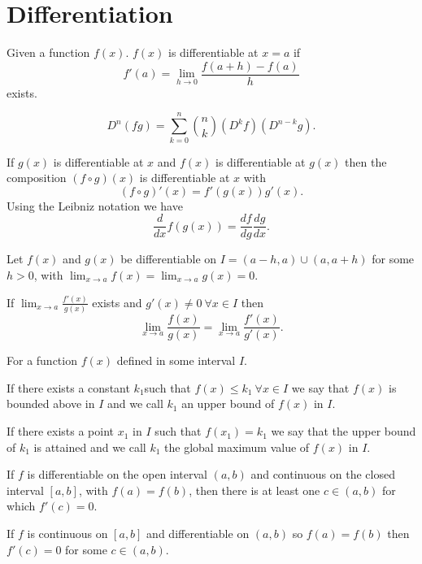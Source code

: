 \documentclass[10pt, a4paper]{article}
\begin{document}
\newpage

\section{Differentiation}

\begin{definition}
    Given a function $f(x)$.
    $f(x)$ is differentiable at $x = a$ if
    \[
    f'(a) = \lim_{h \rightarrow 0}\frac{f(a + h) - f(a)}{h}
    \]
    exists.
\end{definition}

\begin{proposition}
    \[
    D ^ n(fg) = \sum_{k = 0}^{n}\binom{n}{k}(D ^ kf)(D ^ {n - k}g).
    \]
\end{proposition}

\begin{theorem}
    If $g(x)$ is differentiable at $x$ and $f(x)$ is differentiable at $g(x)$ then the composition $(f \circ g)(x)$ is differentiable at $x$ with
    \[
    (f \circ g)'(x) = f'(g(x))g'(x).
    \]
    Using the Leibniz notation we have
    \[
    \frac{d}{dx}f(g(x)) = \frac{df}{dg}\frac{dg}{dx}.
    \]
\end{theorem}

\begin{theorem}
    Let $f(x)$ and $g(x)$ be differentiable on $I = (a - h, a) \cup (a, a + h)$ for some $h > 0$,
    with $\lim_{x \rightarrow a}f(x) = \lim_{x \rightarrow a}g(x) = 0$.

    If $\lim_{x \rightarrow a}\frac{f'(x)}{g(x)}$ exists and $g'(x) \neq 0\ \forall x \in I$ then
    \[
    \lim_{x \rightarrow a}\frac{f(x)}{g(x)} = \lim_{x \rightarrow a}\frac{f'(x)}{g'(x)}.
    \]
\end{theorem}

For a function $f(x)$ defined in some interval $I$.
\begin{definition}
    If there exists a constant $k_1$such that $f(x) \leq k_1\ \forall x \in I$ we say that $f(x)$ is bounded above in $I$ and we call $k_1$ an upper bound of $f(x)$ in $I$.

    If there exists a point $x_1$ in $I$ such that $f(x_1) = k_1$ we say that the upper bound of $k_1$ is attained and we call $k_1$ the global maximum value of $f(x)$ in $I$.
\end{definition}

\begin{theorem}
    If $f$ is differentiable on the open interval $(a, b)$ and continuous on the closed interval $[a, b]$,
    with $f(a) = f(b)$,
    then there is at least one $c \in (a, b)$ for which $f'(c) = 0$.
\end{theorem}
If $f$ is continuous on $[a, b]$ and differentiable on $(a, b)$ so $f(a) = f(b)$ then $f'(c) = 0$ for some $c \in (a, b)$.
\end{document}
